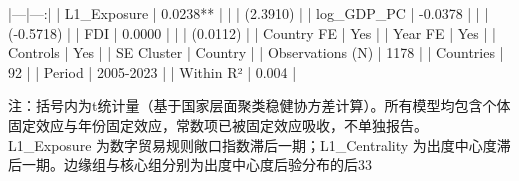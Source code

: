 |---|---:|
| L1_Exposure | 0.0238** |
|  | (2.3910) |
| log_GDP_PC | -0.0378 |
|  | (-0.5718) |
| FDI | 0.0000 |
|  | (0.0112) |
| Country FE | Yes |
| Year FE | Yes |
| Controls | Yes |
| SE Cluster | Country |
| Observations (N) | 1178 |
| Countries | 92 |
| Period | 2005-2023 |
| Within R² | 0.004 |

注：括号内为t统计量（基于国家层面聚类稳健协方差计算）。所有模型均包含个体固定效应与年份固定效应，常数项已被固定效应吸收，不单独报告。
L1_Exposure 为数字贸易规则敞口指数滞后一期；L1_Centrality 为出度中心度滞后一期。边缘组与核心组分别为出度中心度后验分布的后33%